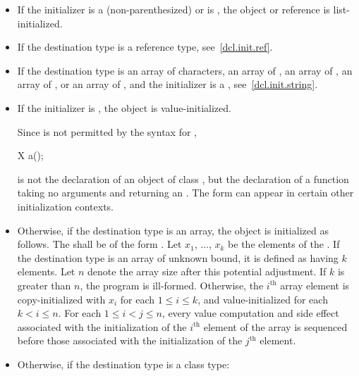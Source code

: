 \begin{itemize}
\item
If the initializer is a (non-parenthesized) 
or is \tcode{=} , the object or reference
is list-initialized.
\item
If the destination type is a reference type, see~\ref{dcl.init.ref}.
\item
If the destination type is an array of characters,
an array of ,
an array of ,
an array of ,
or an array of
,
and the initializer is a , see~\ref{dcl.init.string}.
\item If the initializer is \tcode{()}, the object is value-initialized.
%
\begin{note}
Since
\tcode{()}
is not permitted by the syntax for
,
\begin{codeblock}
X a();
\end{codeblock}
is not the declaration of an object of class
,
but the declaration of a function taking no arguments and returning an
.
The form
\tcode{()}
can appear in certain other initialization contexts.
\end{note}

\item
Otherwise, if the destination type is an array,
the object is initialized as follows.
The  shall be of the form
\tcode{(}  \tcode{)}.
Let $x_1$, $\dotsc$, $x_k$ be
the elements of the .
If the destination type is an array of unknown bound,
it is defined as having $k$ elements.
Let $n$ denote the array size after this potential adjustment.
If $k$ is greater than $n$,
the program is ill-formed.
Otherwise, the $i^\text{th}$ array element is copy-initialized with
$x_i$ for each $1 \leq i \leq k$, and
value-initialized for each $k < i \leq n$.
For each $1 \leq i < j \leq n$,
every value computation and side effect associated with
the initialization of the $i^\text{th}$ element of the array
is sequenced before those associated with
the initialization of the $j^\text{th}$ element.
\item
Otherwise, if the destination type is a class type:


\end{itemize}
